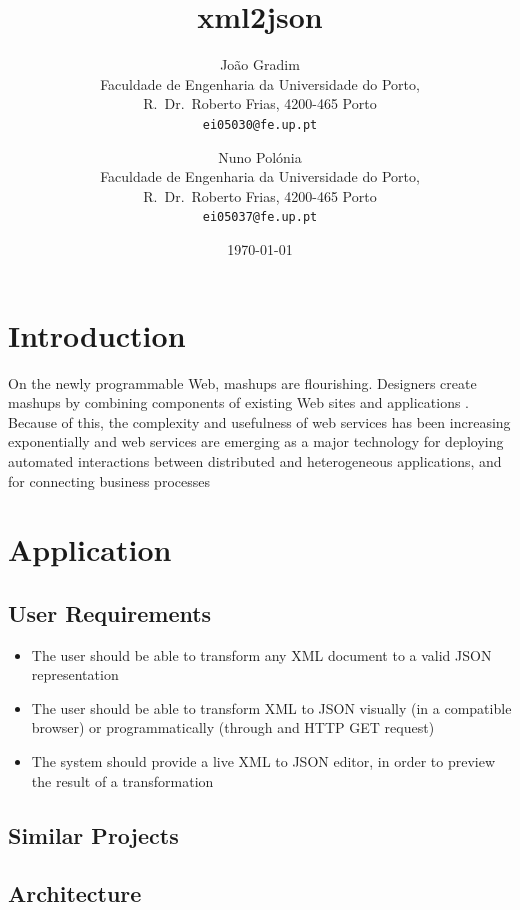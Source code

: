 \documentclass[twocolumn,twoside,10pt,a4paper]{article}
\title{xml2json}
\author{João Gradim\\
\small Faculdade de Engenharia da Universidade do Porto,\\[-0.8ex]
\small R.\ Dr.\ Roberto Frias, 4200-465 Porto\\[-0.8ex]
\small \texttt{ei05030@fe.up.pt}\\
\and
Nuno Polónia\\
\small Faculdade de Engenharia da Universidade do Porto,\\[-0.8ex]
\small R.\ Dr.\ Roberto Frias, 4200-465 Porto\\[-0.8ex]
\small \texttt{ei05037@fe.up.pt}
}
\date{\today}
\begin{document}
\maketitle
\thispagestyle{plain}

\begin{abstract}

\end{abstract}

\section{Introduction}\label{sec:intro}
On the newly programmable Web, mashups are flourishing. Designers create mashups by combining components of existing Web sites and applications \cite{maximilien}.
Because of this, the complexity and usefulness of web services has been increasing exponentially and web services are emerging as a major technology for deploying
automated interactions between distrib­uted and heterogeneous applications, and for connecting business processes \cite{benslimane}




\section{Application}\label{sec:application}

\subsection{User Requirements}\label{sec:user-requirements}

\begin{itemize}
    \item The user should be able to transform any XML document to a valid JSON representation
    \item The user should be able to transform XML to JSON visually (in a compatible browser) or programmatically (through and HTTP GET request)
    \item The system should provide a live XML to JSON editor, in order to preview the result of a transformation
\end{itemize}

\subsection{Similar Projects}\label{sec:similar-projects}
\subsection{Architecture}\label{sec:architecture}
\end{document}

